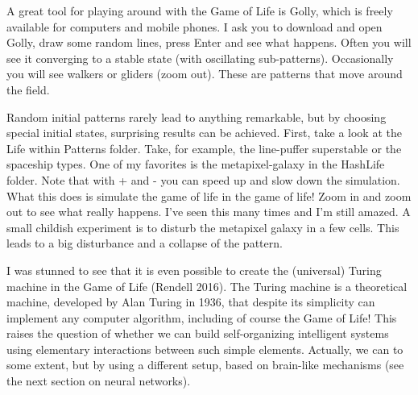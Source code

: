 \documentclass[
  a4paper,
  DIV=11,
  numbers=noendperiod,
  oneside]{scrreprt}
\begin{document}
A great tool for playing around with the Game of Life is Golly, which is
freely available for computers and mobile phones. I ask you to download
and open Golly, draw some random lines, press Enter and see what
happens. Often you will see it converging to a stable state (with
oscillating sub-patterns). Occasionally you will see walkers or gliders
(zoom out). These are patterns that move around the field.

Random initial patterns rarely lead to anything remarkable, but by
choosing special initial states, surprising results can be achieved.
First, take a look at the Life within Patterns folder. Take, for
example, the line-puffer superstable or the spaceship types. One of my
favorites is the metapixel-galaxy in the HashLife folder. Note that with
+ and - you can speed up and slow down the simulation. What this does is
simulate the game of life in the game of life! Zoom in and zoom out to
see what really happens. I've seen this many times and I'm still amazed.
A small childish experiment is to disturb the metapixel galaxy in a few
cells. This leads to a big disturbance and a collapse of the pattern.

I was stunned to see that it is even possible to create the (universal)
Turing machine in the Game of Life (Rendell 2016). The Turing machine is
a theoretical machine, developed by Alan Turing in 1936, that despite
its simplicity can implement any computer algorithm, including of course
the Game of Life! This raises the question of whether we can build
self-organizing intelligent systems using elementary interactions
between such simple elements. Actually, we can to some extent, but by
using a different setup, based on brain-like mechanisms (see the next
section on neural networks).
\end{document}
